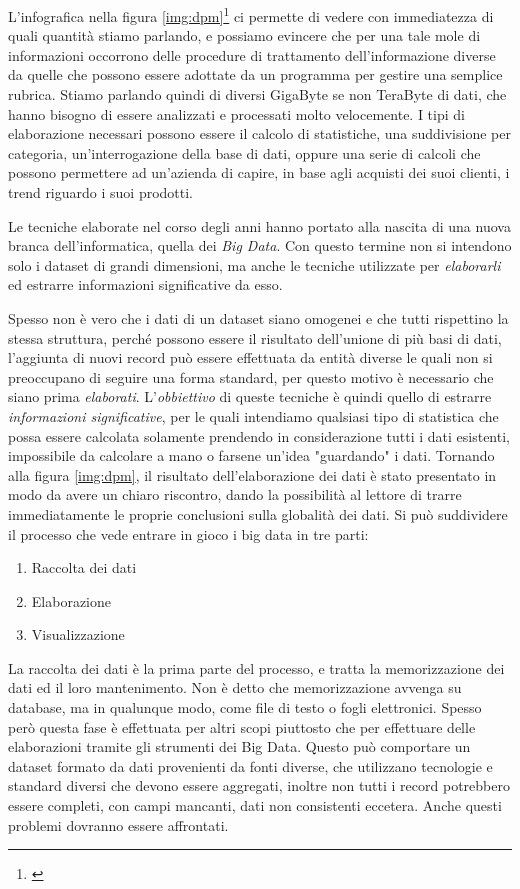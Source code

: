 L'infografica nella figura \ref{img:dpm}\footnote{\cite{data_per_minute}} ci permette di vedere con immediatezza di quali quantità stiamo parlando, e possiamo evincere che per una tale mole di informazioni occorrono delle procedure di trattamento dell'informazione diverse da quelle che possono essere adottate da un programma per gestire una semplice rubrica. Stiamo parlando quindi di diversi GigaByte se non TeraByte di dati, che hanno bisogno di essere analizzati e processati molto velocemente. I tipi di elaborazione necessari possono essere il calcolo di statistiche, una suddivisione per categoria, un'interrogazione della base di dati, oppure una serie di calcoli che possono permettere ad un'azienda di capire, in base agli acquisti dei suoi clienti, i trend riguardo i suoi prodotti. 

Le tecniche elaborate nel corso degli anni hanno portato alla nascita di una nuova branca dell'informatica, quella dei \emph{Big Data}. Con questo termine non si intendono solo i dataset di grandi dimensioni, ma anche le tecniche utilizzate per \emph{elaborarli} ed estrarre informazioni significative da esso. 

Spesso non è vero che i dati di un dataset siano omogenei e che tutti rispettino la stessa struttura, perché possono essere il risultato dell'unione di più basi di dati, l'aggiunta di nuovi record può essere effettuata da entità diverse le quali non si preoccupano di seguire una forma standard, per questo motivo è necessario che siano prima \emph{elaborati}. L'\emph{obbiettivo} di queste tecniche è quindi quello di estrarre \emph{informazioni significative}, per le quali intendiamo qualsiasi tipo di statistica che possa essere calcolata solamente prendendo in considerazione tutti i dati esistenti, impossibile da calcolare a mano o farsene un'idea "guardando" i dati. Tornando alla figura \ref{img:dpm}, il risultato dell'elaborazione dei dati è stato presentato in modo da avere un chiaro riscontro, dando la possibilità al lettore di trarre immediatamente le proprie conclusioni sulla globalità dei dati.
Si può suddividere il processo che vede entrare in gioco i big data in tre parti:
\begin{enumerate}\label{sec:puntibd}
\item Raccolta dei dati
\item Elaborazione
\item Visualizzazione
\end{enumerate}
La raccolta dei dati è la prima parte del processo, e tratta la memorizzazione dei dati ed il loro mantenimento. Non è detto che memorizzazione avvenga su database, ma in qualunque modo, come file di testo o fogli elettronici. Spesso però questa fase è effettuata per altri scopi piuttosto che per effettuare delle elaborazioni tramite gli strumenti dei Big Data. Questo può comportare un dataset formato da dati provenienti da fonti diverse, che utilizzano tecnologie e standard diversi che devono essere aggregati, inoltre non tutti i record potrebbero essere completi, con campi mancanti, dati non consistenti eccetera. Anche questi problemi dovranno essere affrontati.

